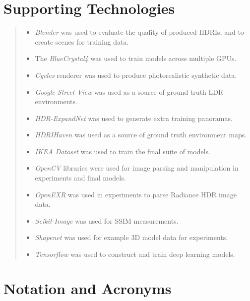 \documentclass[ %
                    author={Gavin Parker},
                supervisor={Dr. Neill Campbell},
                    degree={MEng},
                     title={Deep Siamese Networks for Illumination Estimation from Stereo Images},
                  subtitle={},
                      type={Research},
                      year={2018} ]{dissertation}
\begin{document}


\chapter*{Supporting Technologies}

\vspace{1cm} 
\begin{quote}
\noindent
\begin{itemize}
\item \textit{Blender} was used to evaluate the quality of produced HDRIs, and to create scenes for training data.
\item The \textit{BlueCrystal4} was used to train models across multiple GPUs.
\item \textit{Cycles} renderer was used to produce photorealistic synthetic data.
\item \textit{Google Street View} was used as a source of ground truth LDR environments.
\item \textit{HDR-ExpandNet} was used to generate extra training panoramas.
\item \textit{HDRIHaven} was used as a source of ground truth environment maps.
\item \textit{IKEA Dataset} was used to train the final suite of models.
\item \textit{OpenCV} libraries were used for image parsing and manipulation in experiments and final models.
\item \textit{OpenEXR} was used in experiments to parse Radiance HDR image data.
\item \textit{Scikit-Image} was used for SSIM measurements.
\item \textit{Shapenet} was used for example 3D model data for experiments.
\item \textit{Tensorflow} was used to construct and train deep learning models.


\end{itemize}
\end{quote}


\chapter*{Notation and Acronyms}
\end{document}

